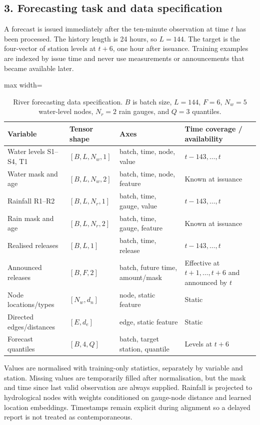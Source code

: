 \documentclass{article}
\begin{document}
\subsection*{3. Forecasting task and data specification}

A forecast is issued immediately after the ten-minute observation at time $t$ has been processed. The history length is 24 hours, so $L=144$. The target is the four-vector of station levels at $t+6$, one hour after issuance. Training examples are indexed by issue time and never use measurements or announcements that became available later.

\begin{table}[htbp]
\centering
\caption*{River forecasting data specification. $B$ is batch size, $L=144$, $F=6$, $N_w=5$ water-level nodes, $N_r=2$ rain gauges, and $Q=3$ quantiles.}
\footnotesize
\begin{adjustbox}{max width=\linewidth}
\begin{tabular}{llll}
\toprule
Variable & Tensor shape & Axes & Time coverage / availability \\
\midrule
Water levels S1--S4, T1 & $[B,L,N_w,1]$ & batch, time, node, value & $t-143,\ldots,t$ \\
Water mask and age & $[B,L,N_w,2]$ & batch, time, node, feature & Known at issuance \\
Rainfall R1--R2 & $[B,L,N_r,1]$ & batch, time, gauge, value & $t-143,\ldots,t$ \\
Rain mask and age & $[B,L,N_r,2]$ & batch, time, gauge, feature & Known at issuance \\
Realised releases & $[B,L,1]$ & batch, time, release & $t-143,\ldots,t$ \\
Announced releases & $[B,F,2]$ & batch, future time, amount/mask & Effective at $t+1,\ldots,t+6$ and announced by $t$ \\
Node locations/types & $[N_w,d_n]$ & node, static feature & Static \\
Directed edges/distances & $[E,d_e]$ & edge, static feature & Static \\
Forecast quantiles & $[B,4,Q]$ & batch, target station, quantile & Levels at $t+6$ \\
\bottomrule
\end{tabular}
\end{adjustbox}
\end{table}

Values are normalised with training-only statistics, separately by variable and station. Missing values are temporarily filled after normalisation, but the mask and time since last valid observation are always supplied. Rainfall is projected to hydrological nodes with weights conditioned on gauge-node distance and learned location embeddings. Timestamps remain explicit during alignment so a delayed report is not treated as contemporaneous.
\end{document}
